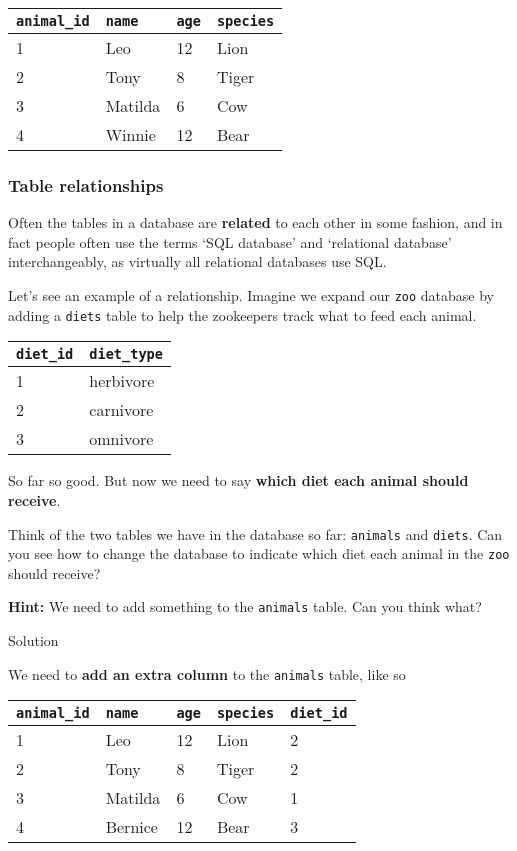 \documentclass[11pt]{article}
\begin{document}
\begin{longtable}[]{@{}llll@{}}
\toprule
\texttt{animal\_id} & \texttt{name} & \texttt{age} &
\texttt{species}\tabularnewline
\midrule
\endhead
1 & Leo & 12 & Lion\tabularnewline
2 & Tony & 8 & Tiger\tabularnewline
3 & Matilda & 6 & Cow\tabularnewline
4 & Winnie & 12 & Bear\tabularnewline
\bottomrule
\end{longtable}

    \hypertarget{table-relationships}{%
\subsubsection{Table relationships}\label{table-relationships}}

Often the tables in a database are \textbf{related} to each other in
some fashion, and in fact people often use the terms `SQL database' and
`relational database' interchangeably, as virtually all relational
databases use SQL.

Let's see an example of a relationship. Imagine we expand our
\texttt{zoo} database by adding a \texttt{diets} table to help the
zookeepers track what to feed each animal.

\begin{longtable}[]{@{}ll@{}}
\toprule
\texttt{diet\_id} & \texttt{diet\_type}\tabularnewline
\midrule
\endhead
1 & herbivore\tabularnewline
2 & carnivore\tabularnewline
3 & omnivore\tabularnewline
\bottomrule
\end{longtable}

So far so good. But now we need to say \textbf{which diet each animal
should receive}.

Think of the two tables we have in the database so far: \texttt{animals}
and \texttt{diets}. Can you see how to change the database to indicate
which diet each animal in the \texttt{zoo} should receive?

\textbf{Hint:} We need to add something to the \texttt{animals} table.
Can you think what?

Solution

We need to \textbf{add an extra column} to the \texttt{animals} table,
like so

\begin{longtable}[]{@{}lllll@{}}
\toprule
\texttt{animal\_id} & \texttt{name} & \texttt{age} & \texttt{species} &
\texttt{diet\_id}\tabularnewline
\midrule
\endhead
1 & Leo & 12 & Lion & 2\tabularnewline
2 & Tony & 8 & Tiger & 2\tabularnewline
3 & Matilda & 6 & Cow & 1\tabularnewline
4 & Bernice & 12 & Bear & 3\tabularnewline
\bottomrule
\end{longtable}
\end{document}
